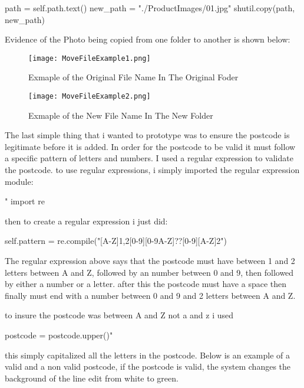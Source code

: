 \begin{python}
path = self.path.text()
new_path = "./ProductImages/01.jpg"
shutil.copy(path, new_path)
\end{python}

Evidence of the Photo being copied from one folder to another is shown below:

\begin{figure}[H]
\caption{Exmaple of the Original File Name In The Original Foder} \label{fig:Exmaple of the Original File Name In The Original Foder}
\hfill\texttt{[image: MoveFileExample1.png]}\hspace*{\fill}
\end{figure}

\begin{figure}[H]
\caption{Exmaple of the New File Name In The New Folder} \label{fig:Exmaple of the Newl File Name In The New Folder}
\hfill\texttt{[image: MoveFileExample2.png]}\hspace*{\fill}
\end{figure}


The last simple thing that i wanted to prototype was to ensure the postcode is legitimate before it is added. In order for the postcode to be valid it must follow a specific pattern of letters and numbers. I used a regular expression to validate the postcode. to use regular expressions, i simply imported the regular expression module: 

\begin{python}"
import re
\end{python} 

then to create a regular expression i just did:
\begin{python}
self.pattern = re.compile("[A-Z]{1,2}[0-9][0-9A-Z]?\s?[0-9][A-Z]{2}")
\end{python}
 The regular expression above says that the postcode must have between 1 and 2 letters between A and Z, followed by an number between 0 and 9, then followed by either a number or a letter. after this the postcode must have a space then finally must end with a number between 0 and 9 and 2 letters between A and Z.

to insure the postcode was between A and Z not a and z i used  

\begin{python}
postcode = postcode.upper()"
\end{python}

 this simply capitalized all the letters in the postcode. Below is an example of a valid and a non valid postcode, if the postcode is valid, the system changes the background of the line edit from white to green.

